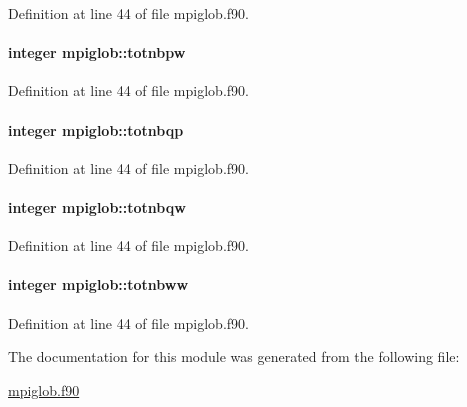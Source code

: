 Definition at line 44 of file mpiglob.\-f90.

\hypertarget{classmpiglob_a7c62e6bb98eaa920eab355149e07538b}{
\paragraph[{totnbpw}]{\setlength{\rightskip}{0pt plus 5cm}integer mpiglob\-::totnbpw}}\label{classmpiglob_a7c62e6bb98eaa920eab355149e07538b}


Definition at line 44 of file mpiglob.\-f90.

\hypertarget{classmpiglob_a6fc8ee8d5ab60bb0373a76203d9abd14}{
\paragraph[{totnbqp}]{\setlength{\rightskip}{0pt plus 5cm}integer mpiglob\-::totnbqp}}\label{classmpiglob_a6fc8ee8d5ab60bb0373a76203d9abd14}


Definition at line 44 of file mpiglob.\-f90.

\hypertarget{classmpiglob_a0dbb040aca4df972d9432f5babdb41d9}{
\paragraph[{totnbqw}]{\setlength{\rightskip}{0pt plus 5cm}integer mpiglob\-::totnbqw}}\label{classmpiglob_a0dbb040aca4df972d9432f5babdb41d9}


Definition at line 44 of file mpiglob.\-f90.

\hypertarget{classmpiglob_a753b40fe692ea2067b87fe87288356ca}{
\paragraph[{totnbww}]{\setlength{\rightskip}{0pt plus 5cm}integer mpiglob\-::totnbww}}\label{classmpiglob_a753b40fe692ea2067b87fe87288356ca}


Definition at line 44 of file mpiglob.\-f90.



The documentation for this module was generated from the following file\-:\begin{DoxyCompactItemize}
\item 
\hyperlink{mpiglob_8f90}{mpiglob.\-f90}\end{DoxyCompactItemize}
